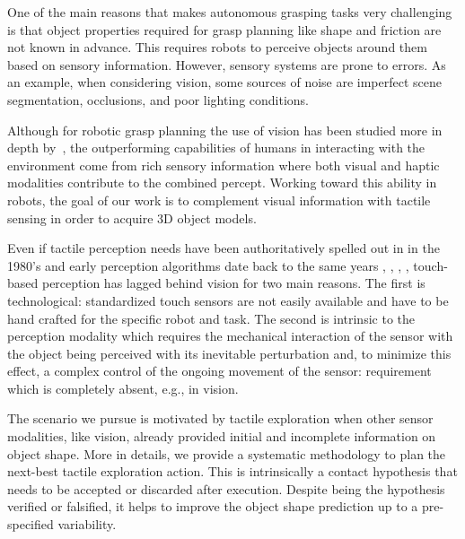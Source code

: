 
One of the main reasons that makes autonomous grasping tasks very challenging is that object properties required for grasp planning like shape and friction are not known %
in advance. 
This requires robots to perceive objects around them based on sensory information. However, sensory systems are prone to errors. As an example, when considering vision, some sources of noise are imperfect scene segmentation, occlusions, and poor lighting conditions.

Although for robotic grasp planning the use of vision has been studied more in depth by~\cite{Kragic2002TechRep}, the outperforming capabilities of humans in interacting with the environment come from rich sensory information where both visual and haptic modalities contribute to the combined percept. Working toward this ability in robots, the goal of our work is to complement visual information with tactile sensing in order to acquire 3D object models.

Even if tactile perception needs have been authoritatively spelled out in \cite{Bajcsy1988Active} in the 1980's and early perception algorithms date back to the same years \cite{Grimson1984JRR}, \cite{Faugeras1983IJCAI}, \cite{Shekhar1986ICRA}, \cite{Bajcsy1989Machine}, touch-based perception has lagged behind vision for two main reasons. The first is technological: standardized touch sensors are not easily available and have to be hand crafted for the specific robot and task. The second is intrinsic to the perception modality which requires the mechanical interaction of the sensor with the object being perceived with its inevitable perturbation and, to minimize this effect, a complex control of the ongoing movement of the sensor: requirement which is completely absent, e.g., in vision.

The scenario we pursue is motivated by tactile exploration when other sensor modalities, like vision, already provided initial and incomplete information on object shape. More in details, we provide a systematic methodology to plan the next-best tactile exploration action. This is intrinsically a contact hypothesis that needs to be accepted or discarded after execution. Despite being the hypothesis verified or falsified, it helps to improve the object shape prediction up to a pre-specified variability.

